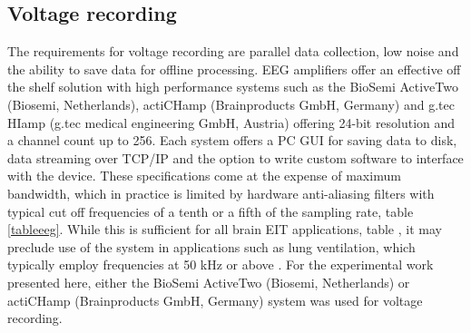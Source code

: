 \subsection{Voltage recording}
The requirements for voltage recording are parallel data collection, low noise and the ability to save data for offline processing. EEG amplifiers offer an effective off the shelf solution with high performance systems such as the BioSemi ActiveTwo (Biosemi, Netherlands), actiCHamp (Brainproducts GmbH, Germany) and g.tec HIamp (g.tec medical engineering GmbH, Austria) offering 24-bit resolution and a channel count up to 256. Each system offers a PC GUI for saving data to disk, data streaming over TCP/IP and the option to write custom software to interface with the device. These specifications come at the expense of maximum bandwidth, which in practice is limited by hardware anti-aliasing filters with typical cut off frequencies of a tenth or a fifth of the sampling rate, table \ref{tableeeg}. While this is sufficient for all brain EIT applications, table \label{table_requirements}, it may preclude use of the system in applications such as lung ventilation, which typically employ frequencies at 50 kHz or above \cite{Frerichs_2000}. For the experimental work presented here, either the BioSemi ActiveTwo (Biosemi, Netherlands) or actiCHamp (Brainproducts GmbH, Germany) system was used for voltage recording. 
